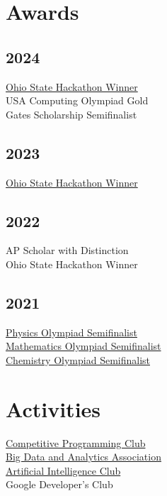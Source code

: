 \documentclass[]{farhan-resume-openfont}
\begin{document}
\begin{minipage}[t]{0.25\textwidth}
    \sectionsep


    \section{Awards}
    \subsection{2024}
    \href{https://hack.osu.edu/hs/fall-2023/}{Ohio State Hackathon Winner} \\
    USA Computing Olympiad Gold \\
    Gates Scholarship Semifinalist
    \subsection{2023}
    \href{https://hack.osu.edu/hs/fall-2023/}{Ohio State Hackathon Winner} \\

    \subsection{2022}
    {AP Scholar with Distinction} \\
    {Ohio State Hackathon Winner} \\
    \subsection{2021}
    \href{https://www.aapt.org/physicsteam/2024/index.cfm}{Physics Olympiad Semifinalist} \\
    \href{https://maa.org/}{Mathematics Olympiad Semifinalist} \\
    \href{https://www.acs.org/education/students/highschool/olympiad.html}{Chemistry Olympiad Semifinalist} \\

    \section{Activities}
    \href{https://cpcosu.github.io/}{Competitive Programming Club} \\
    \href{https://bdaaosu.org/}{Big Data and Analytics Association} \\
    \href{https://www.osuaiclub.com/}{Artificial Intelligence Club} \\
    Google Developer's Club


\end{minipage}
\end{document}
